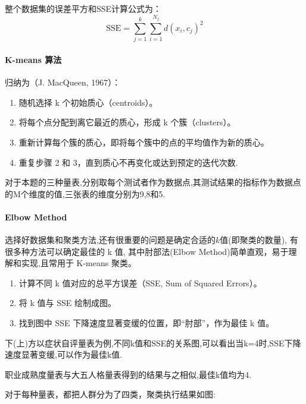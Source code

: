 \documentclass[withoutpreface,bwprint]{cumcmthesis} %
\begin{document}
整个数据集的误差平方和SSE计算公式为：
\begin{equation}
    \text{SSE} = \sum_{j=1}^k \sum_{i=1}^{N_j} d(x_i, c_j)^2
    \label{eq:SSE}
\end{equation}
    

\paragraph*{K-means 算法}归纳为（J. MacQueen, 1967）\cite{k-means}：
\begin{enumerate}
    \item 随机选择 k 个初始质心（centroids）。
    
    \item 将每个点分配到离它最近的质心，形成 k 个簇（clusters）。
    
    \item 重新计算每个簇的质心，即将每个簇中的点的平均值作为新的质心。
    
    \item 重复步骤 2 和 3，直到质心不再变化或达到预定的迭代次数.

\end{enumerate}

对于本题的三种量表,分别取每个测试者作为数据点,其测试结果的指标作为数据点的M个维度的值,三张表的维度分别为9,8和5.


\paragraph*{Elbow Method}选择好数据集和聚类方法,还有很重要的问题是确定合适的$k$值(即聚类的数量),
有很多种方法可以确定最佳的 k 值, 其中肘部法(Elbow Method)简单直观，易于理解和实现,且常用于 K-means 聚类。
\begin{enumerate}
    \item 计算不同 k 值对应的总平方误差（SSE, Sum of Squared Errors）。
    
    \item 将 k 值与 SSE 绘制成图。

    \item 找到图中 SSE 下降速度显著变缓的位置，即“肘部”，作为最佳 k 值。

\end{enumerate}
下(上)方以症状自评量表为例,不同k值和SSE的关系图,可以看出当k=4时,SSE下降速度显著变缓,可以作为最佳k值.

职业成熟度量表与大五人格量表得到的结果与之相似,最佳k值均为4.

对于每种量表，都把人群分为了四类，聚类执行结果如图:
\end{document}
